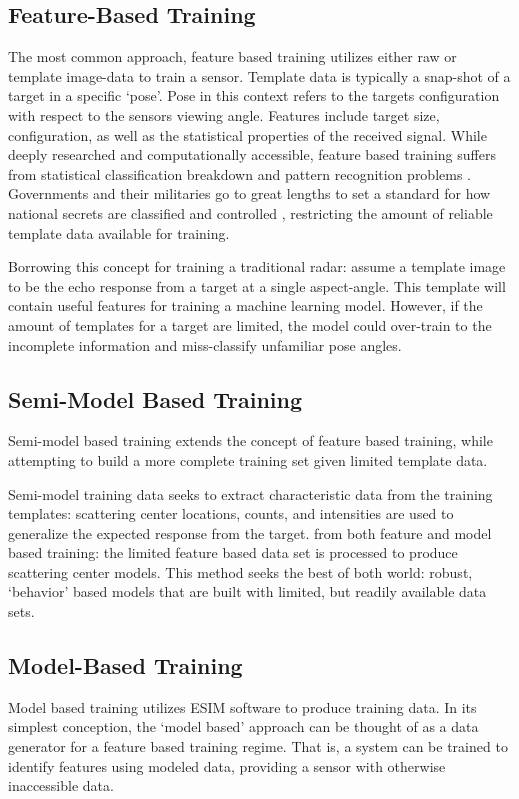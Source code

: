 	\subsection{Feature-Based Training}
		The most common approach, feature based training utilizes either raw or template image-data to train a sensor. Template data is typically a snap-shot of a target in a specific `pose'. Pose in this context refers to the targets configuration with respect to the sensors viewing angle. Features include target size, configuration, as well as the statistical properties of the received signal.  While deeply researched and computationally accessible, feature based training suffers from statistical classification breakdown and pattern recognition problems \cite{SAR_Survey}. Governments and their militaries go to great lengths to set a standard for how national secrets are classified and controlled \cite{EO_10290}\cite{PLA_Class}, restricting the amount of reliable template data available for training.

		Borrowing this concept for training a traditional radar:  assume a template image to be the echo response from a target at a single aspect-angle. This template will contain useful features for training a machine learning model. However, if the amount of templates for a target are limited, the model could over-train to the incomplete information and miss-classify unfamiliar pose angles.

	\subsection{Semi-Model Based Training}
		Semi-model based training extends the concept of feature based training, while attempting to build a more complete training set given limited template data.

		Semi-model training data seeks to extract characteristic data from the training templates:  scattering center locations, counts, and intensities are used to generalize the expected response from the target. from both feature and model based training: the limited feature based data set is processed to produce scattering center models. This method seeks the best of both world:  robust, `behavior' based models that are built with limited, but readily available data sets.

	\subsection{Model-Based Training}
		Model based training utilizes ESIM software to produce training data. In its simplest conception, the `model based' approach can be thought of as a data generator for a feature based training regime. That is, a system can be trained to identify features using modeled data, providing a sensor with otherwise inaccessible data.

